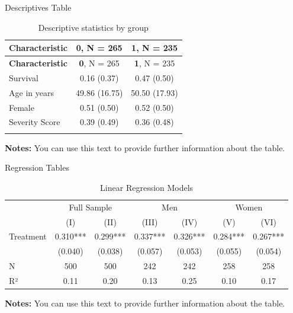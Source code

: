 \documentclass[11pt, aspectratio=169, t]{beamer}
\begin{document}
\begin{frame}{Descriptives Table}
\protect\hypertarget{descriptives-table}{}
\hypertarget{tab-descriptives}{}
\begin{longtable}[]{@{}lcc@{}}
\caption{Descriptive statistics by group }\tabularnewline
\toprule\noalign{}
\textbf{Characteristic} & \textbf{0}, N = 265 & \textbf{1}, N = 235 \\
\midrule\noalign{}
\endfirsthead
\toprule\noalign{}
\textbf{Characteristic} & \textbf{0}, N = 265 & \textbf{1}, N = 235 \\
\midrule\noalign{}
\endhead
Survival & 0.16 (0.37) & 0.47 (0.50) \\
Age in years & 49.86 (16.75) & 50.50 (17.93) \\
Female & 0.51 (0.50) & 0.52 (0.50) \\
Severity Score & 0.39 (0.49) & 0.36 (0.48) \\
\bottomrule\noalign{}
\end{longtable}

\vspace{-10pt}
\begin{minipage}{0.9\textwidth}
\scriptsize
\singlespacing
\textbf{Notes:} You can use this text to provide further information about the table. \lipsum[66]
\end{minipage}
\vspace{15pt}
\end{frame}

\begin{frame}{Regression Tables}
\protect\hypertarget{regression-tables}{}
\hypertarget{tab-regression}{}
\begin{longtable}{lcccccc}
\caption{Linear Regression Models}\tabularnewline

\toprule
 & \multicolumn{2}{c}{Full Sample} & \multicolumn{2}{c}{Men} & \multicolumn{2}{c}{Women} \\ 
\cmidrule(lr){2-3} \cmidrule(lr){4-5} \cmidrule(lr){6-7}
  & (I) & (II) & (III) & (IV) & (V) & (VI) \\ 
\midrule\addlinespace[2.5pt]
Treatment & 0.310*** & 0.299*** & 0.337*** & 0.326*** & 0.284*** & 0.267*** \\ 
 & (0.040) & (0.038) & (0.057) & (0.053) & (0.055) & (0.054) \\ 
N & 500 & 500 & 242 & 242 & 258 & 258 \\ 
R² & 0.11 & 0.20 & 0.13 & 0.25 & 0.10 & 0.17 \\ 
\bottomrule
\end{longtable}

\vspace{-10pt}
\begin{minipage}{0.9\textwidth}
\scriptsize
\singlespacing
\textbf{Notes:} You can use this text to provide further information about the table. \lipsum[66]
\end{minipage}
\vspace{15pt}
\end{frame}
\end{document}
